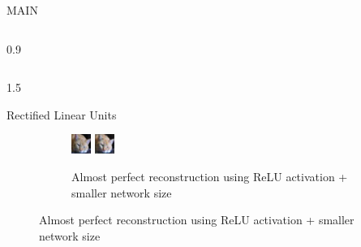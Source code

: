 \documentclass[final]{beamer}
\newlength{\onecolwid}
\newlength{\threecolwid}
\begin{document}
\begin{frame}[t]
\begin{columns}[t]
\begin{column}{\threecolwid}
\begin{alertblock}{MAIN}
\begin{columns}[t, totalwidth=0.9\threecolwid]
\begin{column}{0.9\onecolwid}

\end{column}
\end{columns}

\end{alertblock}

\begin{columns}[t, totalwidth=\threecolwid]
\begin{column}{1.5\onecolwid}

\begin{alertblock}{Rectified Linear Units}

	\begin{figure}
		\centering

		\begin{subfigure}{0.4\linewidth}

			\centering
			\includegraphics[width=0.4\linewidth]{graphics/reconstructions/cifar/relu/input_00_relu.png}
			\includegraphics[width=0.4\linewidth]{graphics/reconstructions/cifar/relu/reconstruction_00_relu.png}

			\caption{Almost perfect reconstruction using ReLU activation + smaller network size}


\end{subfigure}
\end{figure}
\end{alertblock}
\end{column}
\end{columns}
\end{column}
\end{columns}
\end{frame}
\end{document}
